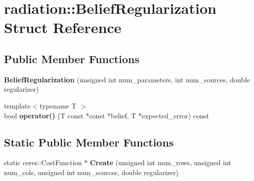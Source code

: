 \hypertarget{structradiation_1_1_belief_regularization}{}\section{radiation\+:\+:Belief\+Regularization Struct Reference}
\label{structradiation_1_1_belief_regularization}
\subsection*{Public Member Functions}
\begin{DoxyCompactItemize}
\item 
\hypertarget{structradiation_1_1_belief_regularization_a299b47bdef4ef20a980376ffc6dad3f7}{}\label{structradiation_1_1_belief_regularization_a299b47bdef4ef20a980376ffc6dad3f7} 
{\bfseries Belief\+Regularization} (unsigned int num\+\_\+parameters, int num\+\_\+sources, double regularizer)
\item 
\hypertarget{structradiation_1_1_belief_regularization_a037b7fcffbf148759e087a1c645ba6be}{}\label{structradiation_1_1_belief_regularization_a037b7fcffbf148759e087a1c645ba6be} 
{\footnotesize template$<$typename T $>$ }\\bool {\bfseries operator()} (T const $\ast$const $\ast$belief, T $\ast$expected\+\_\+error) const
\end{DoxyCompactItemize}
\subsection*{Static Public Member Functions}
\begin{DoxyCompactItemize}
\item 
\hypertarget{structradiation_1_1_belief_regularization_af0b266b48c16d621b921b86ecdb4a406}{}\label{structradiation_1_1_belief_regularization_af0b266b48c16d621b921b86ecdb4a406} 
static ceres\+::\+Cost\+Function $\ast$ {\bfseries Create} (unsigned int num\+\_\+rows, unsigned int num\+\_\+cols, unsigned int num\+\_\+sources, double regularizer)
\end{DoxyCompactItemize}

